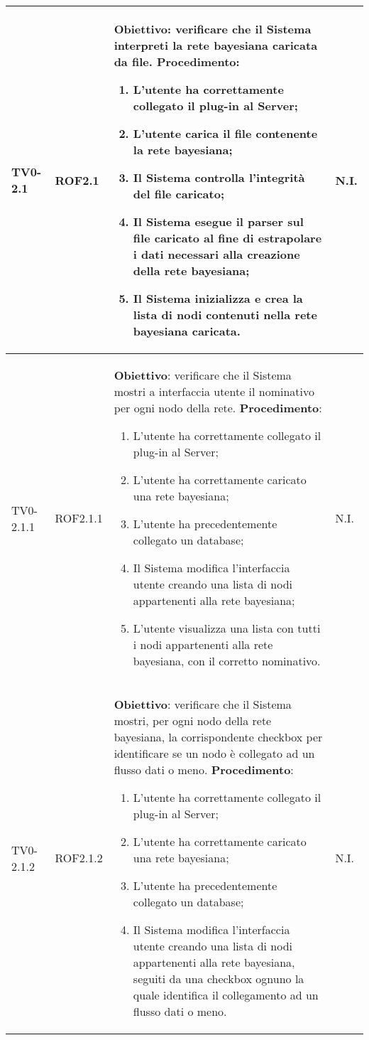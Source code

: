 \begin{longtable}{|C{.15\textwidth}|C{.13\textwidth}|m{.52\textwidth}|C{.08\textwidth}|}
TV0-2.1 & ROF2.1 &
	\textbf{Obiettivo}: verificare che il Sistema interpreti la rete bayesiana caricata da file. \newline
	\textbf{Procedimento}:
	\begin{enumerate}
		\item L'utente ha correttamente collegato il plug-in al Server;
		\item L'utente carica il file contenente la rete bayesiana;
		\item Il Sistema controlla l'integrità del file caricato;
		\item Il Sistema esegue il parser sul file caricato al fine di estrapolare i dati necessari alla creazione della rete bayesiana;
		\item Il Sistema inizializza e crea la lista di nodi contenuti nella rete bayesiana caricata.
	\end{enumerate}
	& N.I. \\
\hline

TV0-2.1.1 & ROF2.1.1 &
	\textbf{Obiettivo}: verificare che il Sistema mostri a interfaccia utente il nominativo per ogni nodo della rete. \newline
	\textbf{Procedimento}:
	\begin{enumerate}
		\item L'utente ha correttamente collegato il plug-in al Server;
		\item L'utente ha correttamente caricato una rete bayesiana;
		\item L'utente ha precedentemente collegato un database;
		\item Il Sistema modifica l'interfaccia utente creando una lista di nodi appartenenti alla rete bayesiana;
		\item L'utente visualizza una lista con tutti i nodi appartenenti alla rete bayesiana, con il corretto nominativo.
	\end{enumerate}
	& N.I. \\
\hline

TV0-2.1.2 & ROF2.1.2&
	\textbf{Obiettivo}: verificare che il Sistema mostri, per ogni nodo della rete bayesiana, la corrispondente checkbox per identificare se un nodo è collegato ad un flusso dati o meno. \newline
	\textbf{Procedimento}:
	\begin{enumerate}
		\item L'utente ha correttamente collegato il plug-in al Server;
		\item L'utente ha correttamente caricato una rete bayesiana;
		\item L'utente ha precedentemente collegato un database;
		\item Il Sistema modifica l'interfaccia utente creando una lista di nodi appartenenti alla rete bayesiana, seguiti da una checkbox ognuno la quale identifica il collegamento ad un flusso dati o meno.
	\end{enumerate}
	& N.I. \\
\hline


\end{longtable}
